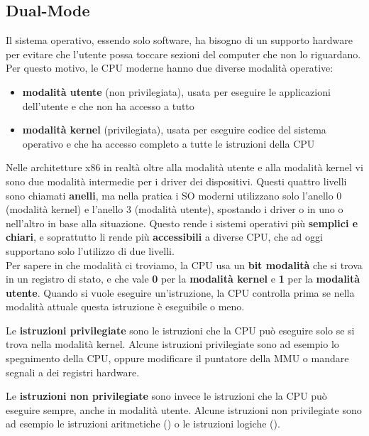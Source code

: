 \documentclass[11pt, a4paper, titlepage, oneside]{scrbook}
\begin{document}
\subsection{Dual-Mode}

Il sistema operativo, essendo solo software, ha bisogno di un supporto hardware per evitare che l'utente possa toccare sezioni del computer che non lo riguardano. Per questo motivo, le CPU moderne hanno due diverse modalità operative:
\begin{itemize}
    \item \textbf{modalità utente} (non privilegiata), usata per eseguire le applicazioni dell'utente e che non ha accesso a tutto
    \item \textbf{modalità kernel} (privilegiata), usata per eseguire codice del sistema operativo e che ha accesso completo a tutte le istruzioni della CPU
\end{itemize}

Nelle architetture x86 in realtà oltre alla modalità utente e alla modalità kernel vi sono due modalità intermedie per i driver dei dispositivi. Questi quattro livelli sono chiamati \textbf{anelli}, ma nella pratica i SO moderni utilizzano solo l'anello 0 (modalità kernel) e l'anello 3 (modalità utente), spostando i driver o in uno o nell'altro in base alla situazione. Questo rende i sistemi operativi più \textbf{semplici e chiari}, e soprattutto li rende più \textbf{accessibili} a diverse CPU, che ad oggi supportano solo l'utilizzo di due livelli. \\
Per sapere in che modalità ci troviamo, la CPU usa un \textbf{bit modalità} che si trova in un registro di stato, e che vale \textbf{0} per la \textbf{modalità kernel} e \textbf{1} per la \textbf{modalità utente}. Quando si vuole eseguire un'istruzione, la CPU controlla prima se nella modalità attuale questa istruzione è eseguibile o meno. 


\begin{Definizione}[Istruzioni]
\label{def-istruzioni}
Le \textbf{istruzioni privilegiate} sono le istruzioni che la CPU può eseguire solo se si trova nella modalità kernel. Alcune istruzioni privilegiate sono ad esempio lo spegnimento della CPU, oppure modificare il puntatore della MMU o mandare segnali a dei registri hardware. 

Le \textbf{istruzioni non privilegiate} sono invece le istruzioni che la CPU può eseguire sempre, anche in modalità utente. Alcune istruzioni non privilegiate sono ad esempio le istruzioni aritmetiche () o le istruzioni logiche ().
\end{Definizione}
\end{document}
